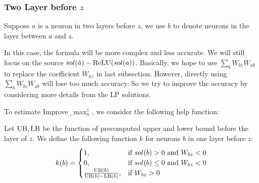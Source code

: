 % 			




\subsubsection*{Two Layer before $z$}

Suppose $a$ is a neuron in two layers before $z$, we use $b$ to denote neurons in the layer between $a$ and $z$. 

In this case, the formula will be more complex and less accurate. We will still focus on the source $sol(\hat{a})-\mathrm{ReLU}(sol(a))$. Basically, we hope to use $\sum_b W_{bz}W_{ab}$ to replace the coefficient $W_{az}$ in last subsection. However, directly using $\sum_b W_{bz}W_{ab}$ will lose too much accuracy. So we try to improve the accuracy by considering more details from the LP solutions.

To estimate Improve\_max$_a^z$ , we consider the following help function:

\begin{definition} \label{2layer}
	Let $\mathrm{UB},\mathrm{LB}$ be the function of precomputed upper and lower bound before the layer of $z$.
	We define the following function $k$ for neurons $b$ in one layer before $z$:
	\begin{align}
		k(b) =
		\begin{cases}
			1, & \text{if } sol(b) > 0 \text{ and } W_{bz} < 0\\
			0, & \text{if } sol(b) \leq 0 \text{ and } W_{bz} < 0\\
			\frac{\mathrm{UB}(b)}{\mathrm{UB}(b)-\mathrm{LB}(b)}, & \text{if }W_{bz} > 0
		\end{cases}
	\end{align} 
\end{definition} 

